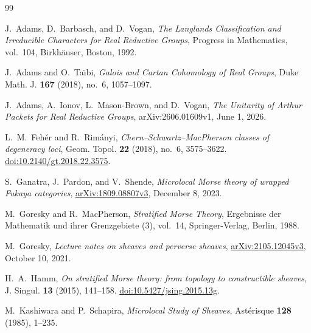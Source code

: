 \documentclass[10pt]{amsart}
\numberwithin{equation}{section}
\theoremstyle{plain}
\theoremstyle{definition}
\theoremstyle{remark}
\begin{document}
\enlargethispage{2\baselineskip}
\begingroup\small
\begin{thebibliography}{99}

J.~Adams, D.~Barbasch, and D.~Vogan,
\emph{The Langlands Classification and Irreducible Characters for Real Reductive Groups},
Progress in Mathematics, vol.~104, Birkh\"auser, Boston, 1992.

J.~Adams and O.~Ta\"{\i}bi,
\emph{Galois and Cartan Cohomology of Real Groups},
Duke Math. J. \textbf{167} (2018), no.~6, 1057--1097.

J.~Adams, A.~Ionov, L.~Mason-Brown, and D.~Vogan,
\emph{The Unitarity of Arthur Packets for Real Reductive Groups},
arXiv:2606.01609v1, June 1, 2026.

L.~M.~Feh\'er and R.~Rim\'anyi,
\emph{Chern--Schwartz--MacPherson classes of degeneracy loci},
Geom. Topol. \textbf{22} (2018), no.~6, 3575--3622.
\href{https://doi.org/10.2140/gt.2018.22.3575}{doi:10.2140/gt.2018.22.3575}.

S.~Ganatra, J.~Pardon, and V.~Shende,
\emph{Microlocal Morse theory of wrapped Fukaya categories},
\href{https://arxiv.org/abs/1809.08807v3}{arXiv:1809.08807v3},
December 8, 2023.

M.~Goresky and R.~MacPherson,
\emph{Stratified Morse Theory},
Ergebnisse der Mathematik und ihrer Grenzgebiete (3), vol.~14,
Springer-Verlag, Berlin, 1988.

M.~Goresky,
\emph{Lecture notes on sheaves and perverse sheaves},
\href{https://arxiv.org/abs/2105.12045v3}{arXiv:2105.12045v3},
October 10, 2021.

H.~A.~Hamm,
\emph{On stratified Morse theory: from topology to constructible sheaves},
J. Singul. \textbf{13} (2015), 141--158.
\href{https://doi.org/10.5427/jsing.2015.13g}{doi:10.5427/jsing.2015.13g}.

M.~Kashiwara and P.~Schapira,
\emph{Microlocal Study of Sheaves},
Ast\'erisque \textbf{128} (1985), 1--235.

\end{thebibliography}
\endgroup
\end{document}
